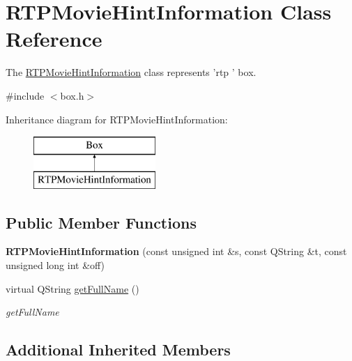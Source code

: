 \hypertarget{class_r_t_p_movie_hint_information}{\section{R\-T\-P\-Movie\-Hint\-Information Class Reference}
\label{class_r_t_p_movie_hint_information}
}


The \hyperlink{class_r_t_p_movie_hint_information}{R\-T\-P\-Movie\-Hint\-Information} class represents 'rtp ' box.  




{\ttfamily \#include $<$box.\-h$>$}

Inheritance diagram for R\-T\-P\-Movie\-Hint\-Information\-:\begin{figure}[H]
\begin{center}
\leavevmode
\includegraphics[height=2.000000cm]{class_r_t_p_movie_hint_information}
\end{center}
\end{figure}
\subsection*{Public Member Functions}
\begin{DoxyCompactItemize}
\item 
\hypertarget{class_r_t_p_movie_hint_information_a5628083591c72ddc3bad312e87f20e34}{{\bfseries R\-T\-P\-Movie\-Hint\-Information} (const unsigned int \&s, const Q\-String \&t, const unsigned long int \&off)}\label{class_r_t_p_movie_hint_information_a5628083591c72ddc3bad312e87f20e34}

\item 
virtual Q\-String \hyperlink{class_r_t_p_movie_hint_information_a392a45bf07f14c417c4acf3dde6b90d2}{get\-Full\-Name} ()
\begin{DoxyCompactList}\small\item\em get\-Full\-Name \end{DoxyCompactList}\end{DoxyCompactItemize}
\subsection*{Additional Inherited Members}


